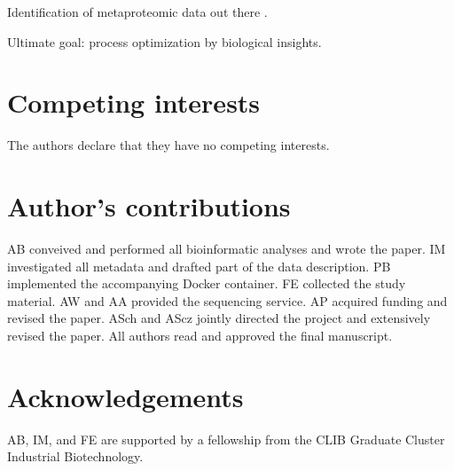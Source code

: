 \documentclass{bmcart}
\begin{document}
Identification of metaproteomic data out there \cite{Kohrs2015}.

Ultimate goal: process optimization by biological insights.


\begin{backmatter}

\section*{Competing interests}
The authors declare that they have no competing interests.

\section*{Author's contributions}
AB conveived and performed all bioinformatic analyses and wrote the paper.
IM investigated all metadata and drafted part of the data description.
PB implemented the accompanying Docker container.
FE collected the study material.
AW and AA provided the sequencing service.
AP acquired funding and revised the paper.
ASch and AScz jointly directed the project and extensively revised the paper.
All authors read and approved the final manuscript.

\section*{Acknowledgements}
AB, IM, and FE are supported by a fellowship from the CLIB Graduate Cluster Industrial Biotechnology.



\end{backmatter}
\end{document}
